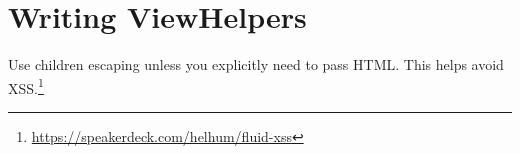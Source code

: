 \chapter{Writing ViewHelpers}

Use children escaping unless you explicitly need to pass HTML. This helps avoid XSS.\footnote{\url{https://speakerdeck.com/helhum/fluid-xss}}
